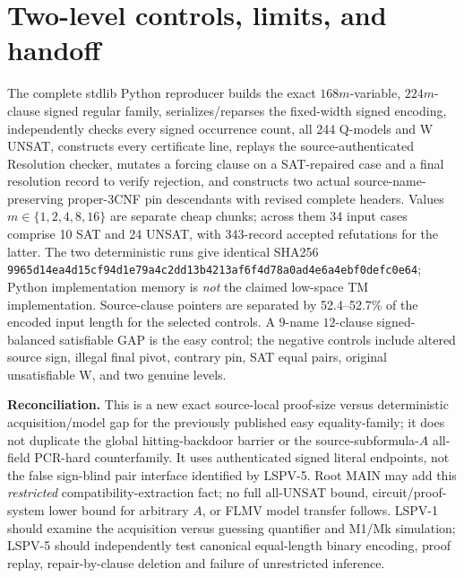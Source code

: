 \documentclass[11pt]{article}
\begin{document}
\section{Two-level controls, limits, and handoff}
The complete stdlib Python reproducer builds the exact $168m$-variable, $224m$-clause signed regular family, serializes/reparses the fixed-width signed encoding, independently checks every signed occurrence count, all 244 Q-models and W UNSAT, constructs every certificate line, replays the source-authenticated Resolution checker, mutates a forcing clause on a SAT-repaired case and a final resolution record to verify rejection, and constructs two actual source-name-preserving proper-3CNF pin descendants with revised complete headers. Values $m\in\{1,2,4,8,16\}$ are separate cheap chunks; across them 34 input cases comprise 10 SAT and 24 UNSAT, with 343-record accepted refutations for the latter. The two deterministic runs give identical SHA256 \texttt{9965d14ea4d15cf94d1e79a4c2dd13b4213af6f4d78a0ad4e6a4ebf0defc0e64}; Python implementation memory is \emph{not} the claimed low-space TM implementation. Source-clause pointers are separated by 52.4--52.7\% of the encoded input length for the selected controls. A $9$-name $12$-clause signed-balanced satisfiable GAP is the easy control; the negative controls include altered source sign, illegal final pivot, contrary pin, SAT equal pairs, original unsatisfiable W, and two genuine levels.

\textbf{Reconciliation.} This is a new exact source-local proof-size versus deterministic acquisition/model gap for the previously published easy equality-family; it does not duplicate the global hitting-backdoor barrier or the source-subformula-$A$ all-field PCR-hard counterfamily. It uses authenticated signed literal endpoints, not the false sign-blind pair interface identified by LSPV-5. Root MAIN may add this \emph{restricted} compatibility-extraction fact; no full all-UNSAT bound, circuit/proof-system lower bound for arbitrary $A$, or FLMV model transfer follows. LSPV-1 should examine the acquisition versus guessing quantifier and M1/Mk simulation; LSPV-5 should independently test canonical equal-length binary encoding, proof replay, repair-by-clause deletion and failure of unrestricted inference.
\end{document}
